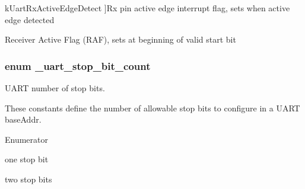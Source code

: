 \begin{Desc}
\begin{description}
{k\+Uart\+Rx\+Active\+Edge\+Detect\hypertarget{group__uart__hal_ggaa4ec9f908b1b8e958c99ddff14373882aaea3e47f7f337f95246c3decdc99abd2}{}\label{group__uart__hal_ggaa4ec9f908b1b8e958c99ddff14373882aaea3e47f7f337f95246c3decdc99abd2}
}]Rx pin active edge interrupt flag, sets when active edge detected \item[{\em 
k\+Uart\+Rx\+Active\hypertarget{group__uart__hal_ggaa4ec9f908b1b8e958c99ddff14373882aca3a161522a90f47010844017a98085d}{}\label{group__uart__hal_ggaa4ec9f908b1b8e958c99ddff14373882aca3a161522a90f47010844017a98085d}
}]Receiver Active Flag (R\+AF), sets at beginning of valid start bit \end{description}
\end{Desc}
\subsubsection[{\texorpdfstring{\+\_\+uart\+\_\+stop\+\_\+bit\+\_\+count}{_uart_stop_bit_count}}]{\setlength{\rightskip}{0pt plus 5cm}enum {\bf \+\_\+uart\+\_\+stop\+\_\+bit\+\_\+count}}\hypertarget{group__uart__hal_ga3c656a4365cab1185398ff953272091e}{}\label{group__uart__hal_ga3c656a4365cab1185398ff953272091e}


U\+A\+RT number of stop bits. 

These constants define the number of allowable stop bits to configure in a U\+A\+RT base\+Addr. \begin{Desc}
\item[Enumerator]\par
\begin{description}
\item[{\em 
k\+Uart\+One\+Stop\+Bit\hypertarget{group__uart__hal_gga3c656a4365cab1185398ff953272091ea792ceeb3ebaaf5b2529423fe8e178d44}{}\label{group__uart__hal_gga3c656a4365cab1185398ff953272091ea792ceeb3ebaaf5b2529423fe8e178d44}
}]one stop bit \item[{\em 
k\+Uart\+Two\+Stop\+Bit\hypertarget{group__uart__hal_gga3c656a4365cab1185398ff953272091ea27898a03ccf45fe91fddfff83be60cea}{}\label{group__uart__hal_gga3c656a4365cab1185398ff953272091ea27898a03ccf45fe91fddfff83be60cea}
}]two stop bits \end{description}
\end{Desc}
